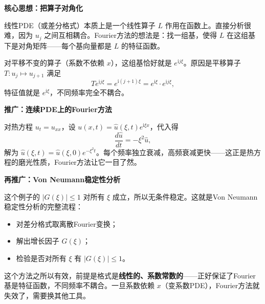 \begin{note}
\textbf{核心思想：把算子对角化}

线性PDE（或差分格式）本质上是一个线性算子 $L$ 作用在函数上。直接分析很难，因为 $u_j$ 之间互相耦合。Fourier方法的想法是：找一组基，使得 $L$ 在这组基下是对角矩阵——每个基向量都是 $L$ 的特征函数。

对平移不变的算子（系数不依赖 $x$），这组基恰好就是 $e^{\mathrm{i}j\xi}$。原因是平移算子 $T: u_j \mapsto u_{j+1}$ 满足
$$T e^{\mathrm{i}j\xi} = e^{\mathrm{i}(j+1)\xi} = e^{\mathrm{i}\xi} \cdot e^{\mathrm{i}j\xi},$$
特征值就是 $e^{\mathrm{i}\xi}$，不同频率完全不耦合。

\textbf{推广：连续PDE上的Fourier方法}

对热方程 $u_t = u_{xx}$，设 $u(x,t) = \hat{u}(\xi,t)e^{\mathrm{i}\xi x}$，代入得
$$\frac{d\hat{u}}{dt} = -\xi^2 \hat{u},$$
解为 $\hat{u}(\xi,t) = \hat{u}(\xi,0)e^{-\xi^2 t}$。每个频率独立衰减，高频衰减更快——这正是热方程的磨光性质，Fourier方法让它一目了然。
\end{note}
\begin{note}
    
\textbf{再推广：Von Neumann稳定性分析}

这个例子的 $|G(\xi)| \leq 1$ 对所有 $\xi$ 成立，所以无条件稳定。这就是Von Neumann稳定性分析的完整流程：
\begin{itemize}
    \item 对差分格式取离散Fourier变换；
    \item 解出增长因子 $G(\xi)$；
    \item 检验是否对所有 $\xi$ 有 $|G(\xi)| \leq 1$。
\end{itemize}
这个方法之所以有效，前提是格式是\textbf{线性的、系数常数的}——正好保证了Fourier基是特征函数，不同频率不耦合。一旦系数依赖 $x$（变系数PDE），Fourier方法就失效了，需要换其他工具。
\end{note}
